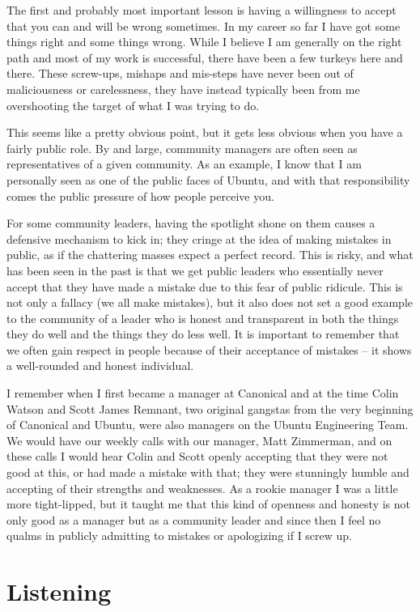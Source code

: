 The first and probably most important lesson is having a willingness to accept
that you can and will be wrong sometimes. In my career so far I have got some
things right and some things wrong. While I believe I am generally on the right
path and most of my work is successful, there have been a few turkeys here and
there. These screw-ups, mishaps and mis-steps have never been out of
maliciousness or carelessness, they have instead typically been from me
overshooting the target of what I was trying to do.

This seems like a pretty obvious point, but it gets less obvious when you have a
fairly public role. By and large, community managers are often seen as
representatives of a given community. As an example, I know that I am personally
seen as one of the public faces of Ubuntu, and with that responsibility comes
the public pressure of how people perceive you.

For some community leaders, having the spotlight shone on them causes a
defensive mechanism to kick in; they cringe at the idea of making mistakes in
public, as if the chattering masses expect a perfect record. This is risky, and
what has been seen in the past is that we get public leaders who essentially
never accept that they have made a mistake due to this fear of public ridicule.
This is not only a fallacy (we all make mistakes), but it also does not set a
good example to the community of a leader who is honest and transparent in both
the things they do well and the things they do less well. It is important to
remember that we often gain respect in people because of their acceptance of
mistakes -- it shows a well-rounded and honest individual.

I remember when I first became a manager at Canonical and at the time Colin
Watson and Scott James Remnant, two original gangstas from the very beginning of
Canonical and Ubuntu, were also managers on the Ubuntu Engineering Team. We
would have our weekly calls with our manager, Matt Zimmerman, and on these calls
I would hear Colin and Scott openly accepting that they were not good at this,
or had made a mistake with that; they were stunningly humble and accepting of
their strengths and weaknesses. As a rookie manager I was a little more
tight-lipped, but it taught me that this kind of openness and honesty is not
only good as a manager but as a community leader and since then I feel no qualms
in publicly admitting to mistakes or apologizing if I screw up.

\section*{Listening}


